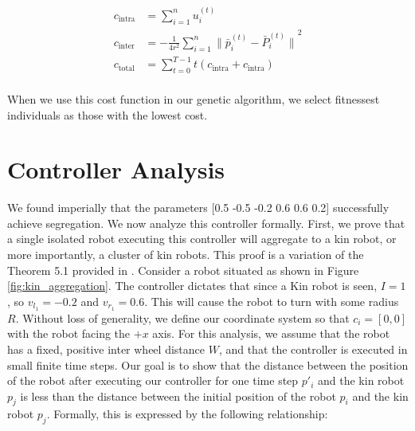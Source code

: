 \documentclass[conference]{IEEEtran}
\begin{document}
  \begin{align*}
  c_{\text{intra}} &= \sum_{i=1}^n u_i^{(t)} \\
  c_{\text{inter}} &= -\frac{1} {4r^2}\sum_{i=1}^n{\lVert \bar{p}_i^{(t)} - \bar{P}_i^{(t)} \rVert}^2 \\
  c_{\text{total}} &=  \sum_{t=0}^{T-1} t (c_{\text{intra}} + c_{\text{intra}}) \\
  \end{align*}

  When we use this cost function in our genetic algorithm, we select fitnessest individuals as those with the lowest cost.


\section{Controller Analysis}

  We found imperially that the parameters [0.5 -0.5 -0.2 0.6 0.6 0.2] successfully achieve segregation. We now analyze this controller formally. First, we prove that a single isolated robot executing this controller will aggregate to a kin robot, or more importantly, a cluster of kin robots. This proof is a variation of the Theorem 5.1 provided in \cite{gauci_self-organized_2014}. Consider a robot situated as shown in Figure \ref{fig:kin_aggregation}. The controller dictates that since a Kin robot is seen, $I=1$, so $v_{l_1} = -0.2$ and $v_{r_1} = 0.6$. This will cause the robot to turn with some radius $R$. Without loss of generality, we define our coordinate system so that $c_i=[0,0]$ with the robot facing the $+x$ axis. For this analysis, we assume that the robot has a fixed, positive inter wheel distance $W$, and that the controller is executed in small finite time steps. Our goal is to show that the distance between the position of the robot after executing our controller for one time step $p'_i$ and the kin robot $p_j$ is less than the distance between the initial position of the robot $p_i$ and the kin robot $p_j$. Formally, this is expressed by the following relationship:
\end{document}
